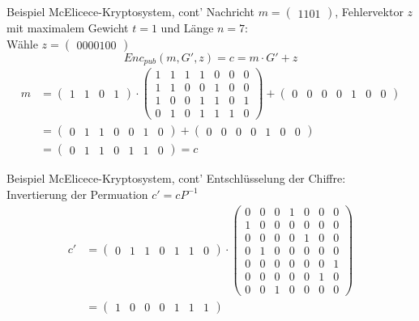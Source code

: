 \documentclass[11pt%
,aspectratio=169%
]{beamer}
\begin{document}
\begin{frame}{Beispiel McElicece-Kryptosystem, cont'}
Nachricht $m = \begin{pmatrix} 1 1 0 1 \end{pmatrix}$, Fehlervektor $z$ mit maximalem Gewicht $t = 1$ und Länge $n = 7$: \\
Wähle $z =  \begin{pmatrix} 0 0 0 0 1 0 0 \end{pmatrix}$ 
$$
    Enc_{pub}(m, G', z) = c = m \cdot G' + z
$$
\begin{align*}
    m &= \begin{pmatrix} 1 & 1 & 0 & 1 \end{pmatrix} \cdot \begin{pmatrix} 1 & 1 & 1 & 1 & 0 & 0 & 0 \\ 1 & 1 & 0 & 0 & 1 & 0 & 0 \\ 1 & 0 & 0 & 1 & 1 & 0 & 1 \\ 0 & 1 & 0 & 1 & 1 & 1 & 0 \end{pmatrix} + \begin{pmatrix} 0 & 0 & 0 & 0 & 1 & 0 & 0 \end{pmatrix}\\
    &= \begin{pmatrix} 0 & 1 & 1 & 0 & 0 & 1 & 0 \end{pmatrix} + \begin{pmatrix} 0 & 0 & 0 & 0 & 1 & 0 & 0 \end{pmatrix}\\
    &= \begin{pmatrix} 0 & 1 & 1 & 0 & 1 & 1 & 0 \end{pmatrix}=c    
\end{align*}
\end{frame}

\begin{frame}{Beispiel McElicece-Kryptosystem, cont'}
Entschlüsselung der Chiffre:\\
Invertierung der Permuation $c' = cP^{-1}$
\begin{align*}
       c' &= \begin{pmatrix} 0 & 1 & 1 & 0 & 1 & 1 & 0 \end{pmatrix} \cdot \begin{pmatrix} 0 & 0 & 0 & 1 & 0 & 0 & 0 \\ 1 & 0 & 0 & 0 & 0 & 0 & 0 \\ 0 & 0 & 0 & 0 & 1 & 0 & 0 \\ 0 & 1 & 0 & 0 & 0 & 0 & 0 \\ 0 & 0 & 0 & 0 & 0 & 0 & 1 \\ 0 & 0 & 0 & 0 & 0 & 1 & 0 \\ 0 & 0 & 1 & 0 & 0 & 0 & 0 \end{pmatrix}\\
       &= \begin{pmatrix} 1 & 0 & 0 & 0 & 1 & 1 & 1 \end{pmatrix}
\end{align*}
\end{frame}
\end{document}

